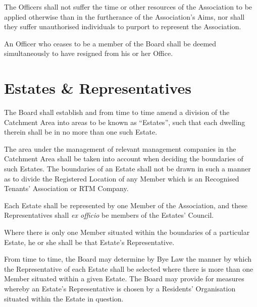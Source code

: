 \documentclass[10pt]{mk-articles-of-association}
\newcommand{\EC}[0]{Board}
\newcommand{\Exec}[0]{\EC{} }
\newcommand{\RA}[0]{Residents' Organisation}
\newcommand{\RTA}[0]{Recognised Tenants' Association}
\begin{document}
\begin{constenum}
    \item The Officers shall not suffer the time or other resources of
      the Association to be applied otherwise than in the furtherance of
      the Association's Aims, nor shall they suffer unauthorised individuals
      to purport to represent the Association.

    \item An Officer who ceases to be a member of the \Exec shall be
      deemed simultaneously to have resigned from his or her Office.

  \end{constenum}


\section{Estates \& Representatives}

\begin{constenum}

\item The \Exec shall establish and from time to time amend a division
  of the Catchment Area into areas to be known as ``Estates'', such
  that each dwelling therein shall be in no more than one such Estate.

\item The area under the management of relevant management
  companies in the Catchment Area shall be taken into account when
  deciding the boundaries of such Estates. The boundaries of an Estate
  shall not be drawn in such a manner as to divide the Registered
  Location of any Member which is an \RTA{} or RTM Company.

\item
  Each Estate shall be represented
  by one Member of the Association, and these
  Representatives shall \textit{ex officio} be members of the
  Estates' Council.

\item
  Where there is only one Member situated within
  the boundaries of a particular Estate, he or she shall be that
  Estate's Representative.

\item
  From time to time, the \Exec may determine by Bye Law the manner by
  which the Representative of each Estate shall be selected where
  there is more than one Member situated within a
  given Estate.  The \Exec may provide for measures whereby an
  Estate's Representative is chosen by a \RA{} situated within the Estate in
  question.

\end{constenum}
\end{document}
